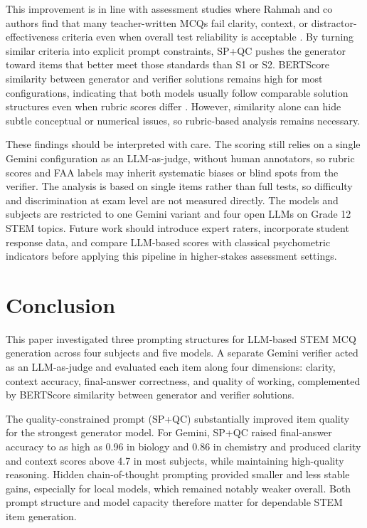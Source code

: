 \documentclass[a4paper,conference]{IEEEtran}
\begin{document}
This improvement is in line with assessment studies where Rahmah and co authors find that many teacher-written MCQs fail clarity, context, or distractor-effectiveness criteria even when overall test reliability is acceptable \cite{rahmah2020}. By turning similar criteria into explicit prompt constraints, SP+QC pushes the generator toward items that better meet those standards than S1 or S2. BERTScore similarity between generator and verifier solutions remains high for most configurations, indicating that both models usually follow comparable solution structures even when rubric scores differ \cite{hanna2021finegrained}. However, similarity alone can hide subtle conceptual or numerical issues, so rubric-based analysis remains necessary.

These findings should be interpreted with care. The scoring still relies on a single Gemini configuration as an LLM-as-judge, without human annotators, so rubric scores and FAA labels may inherit systematic biases or blind spots from the verifier. The analysis is based on single items rather than full tests, so difficulty and discrimination at exam level are not measured directly. The models and subjects are restricted to one Gemini variant and four open LLMs on Grade 12 STEM topics. Future work should introduce expert raters, incorporate student response data, and compare LLM-based scores with classical psychometric indicators before applying this pipeline in higher-stakes assessment settings.

\section{Conclusion}

This paper investigated three prompting structures for LLM-based STEM MCQ generation across four subjects and five models. A separate Gemini verifier acted as an LLM-as-judge and evaluated each item along four dimensions: clarity, context accuracy, final-answer correctness, and quality of working, complemented by BERTScore similarity between generator and verifier solutions.

The quality-constrained prompt (SP+QC) substantially improved item quality for the strongest generator model. For Gemini, SP+QC raised final-answer accuracy to as high as 0.96 in biology and 0.86 in chemistry and produced clarity and context scores above 4.7 in most subjects, while maintaining high-quality reasoning. Hidden chain-of-thought prompting provided smaller and less stable gains, especially for local models, which remained notably weaker overall. Both prompt structure and model capacity therefore matter for dependable STEM item generation.
\end{document}
